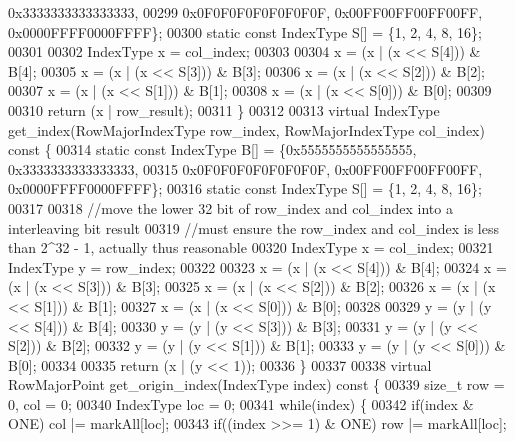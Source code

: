 \begin{DoxyCode}
      0x3333333333333333,
00299                         0x0F0F0F0F0F0F0F0F, 0x00FF00FF00FF00FF, 
      0x0000FFFF0000FFFF\};
00300                 \textcolor{keyword}{static} \textcolor{keyword}{const} IndexType S[] = \{1, 2, 4, 8, 16\};
00301 
00302                 IndexType x = col\_index;
00303 
00304                 x = (x | (x << S[4])) & B[4];
00305                 x = (x | (x << S[3])) & B[3];
00306                 x = (x | (x << S[2])) & B[2];
00307                 x = (x | (x << S[1])) & B[1];
00308                 x = (x | (x << S[0])) & B[0];
00309 
00310                 \textcolor{keywordflow}{return} (x | row\_result);
00311         \}
00312 
00313         \textcolor{keyword}{virtual} IndexType get_index(RowMajorIndexType row\_index, 
      RowMajorIndexType col\_index)\textcolor{keyword}{ const }\{
00314                 \textcolor{keyword}{static} \textcolor{keyword}{const} IndexType B[] = \{0x5555555555555555, 
      0x3333333333333333,
00315                         0x0F0F0F0F0F0F0F0F, 0x00FF00FF00FF00FF, 
      0x0000FFFF0000FFFF\};
00316                 \textcolor{keyword}{static} \textcolor{keyword}{const} IndexType S[] = \{1, 2, 4, 8, 16\};
00317 
00318                 \textcolor{comment}{//move the lower 32 bit of row\_index and col\_index into a
       interleaving bit result}
00319                 \textcolor{comment}{//must ensure the row\_index and col\_index is less than 2^32 -
       1, actually thus reasonable}
00320                 IndexType x = col\_index;
00321                 IndexType y = row\_index;
00322 
00323                 x = (x | (x << S[4])) & B[4];
00324                 x = (x | (x << S[3])) & B[3];
00325                 x = (x | (x << S[2])) & B[2];
00326                 x = (x | (x << S[1])) & B[1];
00327                 x = (x | (x << S[0])) & B[0];
00328 
00329                 y = (y | (y << S[4])) & B[4];
00330                 y = (y | (y << S[3])) & B[3];
00331                 y = (y | (y << S[2])) & B[2];
00332                 y = (y | (y << S[1])) & B[1];
00333                 y = (y | (y << S[0])) & B[0];
00334 
00335                 \textcolor{keywordflow}{return} (x | (y << 1));
00336         \}
00337 
00338         \textcolor{keyword}{virtual} RowMajorPoint get_origin_index(IndexType index)\textcolor{keyword}{ const }\{
00339                 \textcolor{keywordtype}{size\_t} row = 0, col = 0;
00340                 IndexType loc = 0;
00341                 \textcolor{keywordflow}{while}(index) \{
00342                         \textcolor{keywordflow}{if}(index & ONE) col |= markAll[loc];
00343                         \textcolor{keywordflow}{if}((index >>= 1) & ONE) row |= markAll[loc];

\end{DoxyCode}
